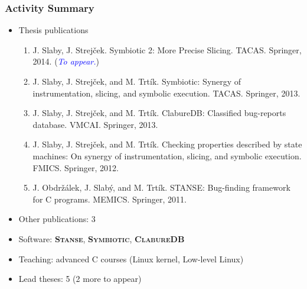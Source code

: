 \documentclass[xcolor=dvipsnames]{beamer}
\let\Oldemph\emph
\renewcommand{\emph}[1]{\textcolor{blue}{\Oldemph{#1}}}
\newcommand{\cdb}{\textbf{\textsc{ClabureDB}}\xspace}
\newcommand{\stan}{\textbf{\textsc{Stanse}}\xspace}
\newcommand{\symb}{\textbf{\textsc{Symbiotic}}\xspace}
\begin{document}
\begin{frame}
  \frametitle{Activity Summary}

  \begin{itemize}
    \item Thesis publications
    \begin{enumerate}
      \small
      \item J. Slaby, J. Strejček. Symbiotic 2: More Precise Slicing. TACAS.
      Springer, 2014. (\emph{To appear.})

      \item J. Slaby, J. Strejček, and M. Trtík. Symbiotic: Synergy of
      instrumentation, slicing, and symbolic execution. TACAS. Springer, 2013.

      \item J. Slaby, J. Strejček, and M. Trtík. ClabureDB: Classified
      bug-reports database. VMCAI. Springer, 2013.

      \item J. Slaby, J. Strejček, and M. Trtík. Checking properties
      described by state machines: On synergy of instrumentation, slicing, and
      symbolic execution. FMICS. Springer, 2012.

      \item J. Obdržálek, J. Slabý, and M. Trtík. STANSE: Bug-finding framework
      for C programs. MEMICS. Springer, 2011.

    \end{enumerate}

    \item Other publications: 3
    \item Software: \stan, \symb, \cdb
    \item Teaching: advanced C courses (Linux kernel, Low-level Linux)
    \item Lead theses: 5 (2 more to appear)
  \end{itemize}

\end{frame}

\appendix
{}
\setcounter{finalframe}{\value{framenumber}}
\end{document}
